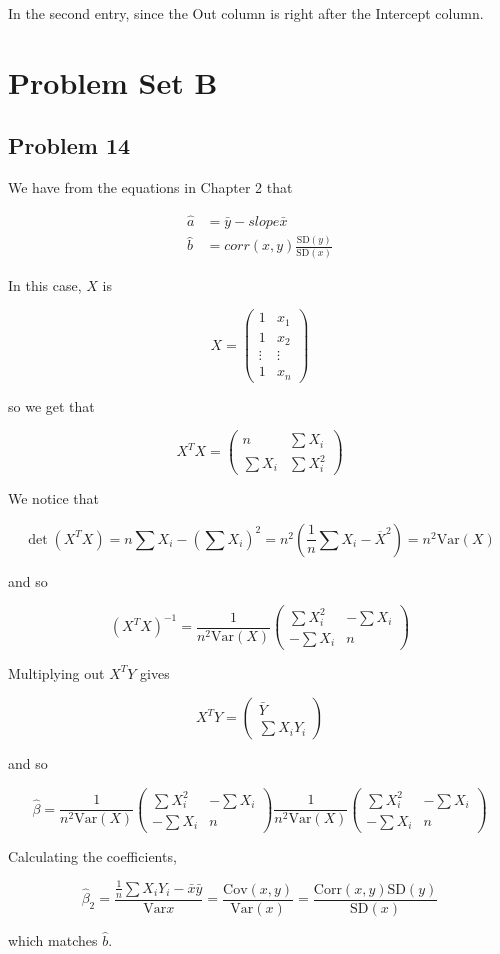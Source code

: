 \documentclass{article}
\newcommand{\var}{\text{Var}}
\newcommand{\cov}{\text{Cov}}
\newcommand{\corr}{\text{Corr}}
\newcommand{\sd}{\text{SD}}
\begin{document}
In the second entry, since the Out column is right after the Intercept column.

\section*{Problem Set B}

\subsection*{Problem 14}

We have from the equations in Chapter 2 that

\begin{align*}
\hat{a} &= \bar{y}-slope \bar{x} \\
\hat{b} &= corr(x, y)\frac{\sd(y)}{\sd(x)}
\end{align*}

In this case, $X$ is

\[
X = \begin{pmatrix}
1 & x_1 \\
1 & x_2 \\
\vdots & \vdots \\
1 & x_n
\end{pmatrix}
\]

so we get that

\[
X^TX = \begin{pmatrix}
n & \sum X_i \\
\sum X_i & \sum X_i^2
\end{pmatrix}
\]

We notice that

\[
\det(X^TX) = n\sum X_i - (\sum X_i)^2 = n^2 (\frac{1}{n} \sum X_i - \overline{X}^2) = n^2\var(X)
\]

and so

\[
(X^TX)^{-1} = \frac{1}{n^2 \var(X)} \begin{pmatrix}
\sum X_i^2 & -\sum X_i \\
- \sum X_i & n
\end{pmatrix}
\]

Multiplying out $X^TY$ gives

\[
X^TY = \begin{pmatrix}
\bar{Y} \\ \sum X_iY_i
\end{pmatrix}
\]

and so

\[
\hat{\beta} = \frac{1}{n^2 \var(X)} \begin{pmatrix}
\sum X_i^2 & -\sum X_i \\
- \sum X_i & n
\end{pmatrix}
\frac{1}{n^2 \var(X)} \begin{pmatrix}
\sum X_i^2 & -\sum X_i \\
- \sum X_i & n
\end{pmatrix}
\]

Calculating the coefficients,

\[
\hat{\beta}_2 = \frac{\frac{1}{n}\sum X_iY_i - \bar{x}\bar{y}}{\var{x}} = \frac{\cov(x, y)}{\var(x)}
= \frac{\corr(x, y)\sd(y)}{\sd(x)}
\]

which matches $\hat{b}$.
\end{document}
